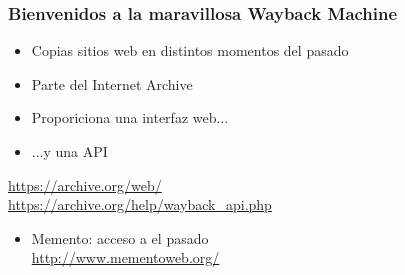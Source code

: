 \begin{frame}
\frametitle{Bienvenidos a la maravillosa Wayback Machine}

{\Large
\begin{itemize}
\item Copias sitios web en distintos momentos del pasado
\item Parte del Internet Archive
\item Proporiciona una interfaz web...
\item ...y una API
\end{itemize}

\begin{flushright}
\url{https://archive.org/web/} \\
\url{https://archive.org/help/wayback_api.php} \\
\end{flushright}

\begin{itemize}
\item Memento: acceso a el pasado \\
  \url{http://www.mementoweb.org/} \\
\end{itemize}
}


\end{frame}


